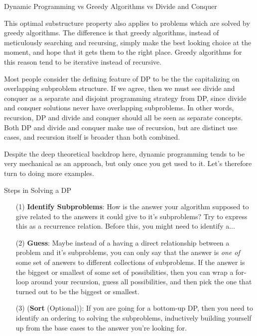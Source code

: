 \documentclass{beamer}
\begin{document}
\begin{frame}{Dynamic Programming vs Greedy Algorithms vs Divide and Conquer}
    \begin{itemize}
        {\small \item This optimal substructure property also applies to problems which are solved by greedy algorithms. The difference is that greedy algorithms, instead of meticulously searching and recursing, simply make the best looking choice at the moment, and hope that it gets them to the right place. Greedy algorithms for this reason tend to be iterative instead of recursive. 
        \item Most people consider the defining feature of DP to be the the capitalizing on overlapping subproblem structure. If we agree, then we must see divide and conquer as a separate and disjoint programming strategy from DP, since divide and conquer solutions never have overlapping subproblems. In other words, recursion, DP and divide and conquer should all be seen as separate concepts. Both DP and divide and conquer make use of recursion, but are distinct use cases, and recursion itself is broader than both combined.  
        \item Despite the deep theoretical backdrop here, dynamic programming tends to be very mechanical as an approach, but only once you get used to it. Let's therefore turn to doing more examples.} 
    \end{itemize}
\end{frame}

\begin{frame}{Steps in Solving a DP}
    \begin{itemize}
        \item[(1)] \textbf{Identify Subproblems}: How is the answer your algorithm supposed to give related to the answers it could give to it's subproblems? Try to express this as a recurrence relation. Before this, you might need to identify a... \pause 
        \item[(2)] \textbf{Guess}: Maybe instead of a having a direct relationship between a problem and it's subproblems, you can only say that the answer is \emph{one of} some set of answers to different collections of subproblems. If the answer is the biggest or smallest of some set of possibilities, then you can wrap a for-loop around your recursion, guess all possibilities, and then pick the one that turned out to be the biggest or smallest.
        \item[(3)] (\textbf{Sort} (Optional)): If you are going for a bottom-up DP, then you need to identify an ordering to solving the subproblems, inductively building yourself up from the base cases to the answer you're looking for. 
    \end{itemize}
\end{frame}
\end{document}
